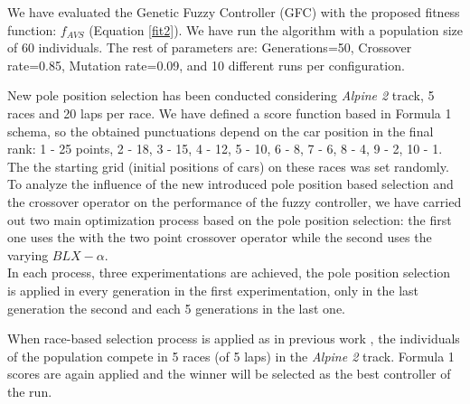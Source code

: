 \documentclass[10pt,journal,compsoc]{IEEEtran}
\begin{document}
We have evaluated the Genetic Fuzzy Controller (GFC) with the proposed fitness function: $f_{AVS}$ (Equation \ref{fit2}). We have run the algorithm with a population size of 60 individuals. The rest of parameters are: Generations=50, Crossover rate=0.85, Mutation rate=0.09, and 10 different runs per configuration.

New pole position selection has been conducted considering \textit{Alpine 2} track, 5 races and 20 laps per race. 
We have defined a score function based in Formula 1 schema, so the obtained punctuations depend on the car position in the final rank: 1 - 25 points, 2 - 18, 3 - 15, 4 - 12, 5 - 10, 6 - 8, 7 - 6, 8 - 4, 9 - 2, 10 - 1. The the starting grid (initial positions of cars) on these races was set randomly.\\

To analyze the influence of the new introduced pole position based selection  and the crossover operator on the performance of the fuzzy controller, we have carried out  two main optimization process based on the pole position  selection: the first one uses the  with the two point crossover operator while the second uses the varying $BLX-\alpha$. \\
In each process, three experimentations are achieved, the pole position selection is applied in every generation in the first experimentation, only in the last generation the second and each 5 generations in the last one.
 
When race-based selection process is applied as in previous work \cite{salem_cig2018}, the individuals of the population compete in 5 races (of 5 laps) in the \textit{Alpine 2} track. Formula 1 scores are again applied and the winner will be selected as the best controller of the run.
\end{document}
